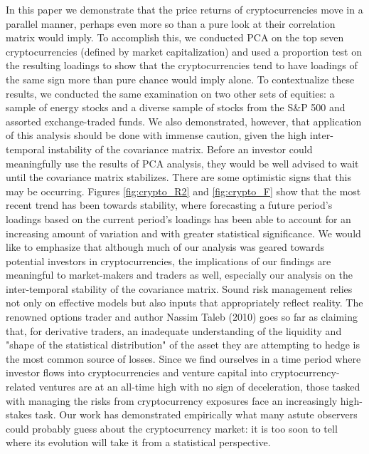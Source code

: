 \documentclass[12pt,twoside]{article}
\begin{document}
In this paper we demonstrate that the price returns of cryptocurrencies move in a parallel manner, perhaps even more so than a pure look at their correlation matrix would imply. To accomplish this, we conducted PCA on the top seven cryptocurrencies (defined by market capitalization) and used a proportion test on the resulting loadings to show that the cryptocurrencies tend to have loadings of the same sign more than pure chance would imply alone. To contextualize these results, we conducted the same examination on two other sets of equities: a sample of energy stocks and a diverse sample of stocks from the S\&P 500 and assorted exchange-traded funds.
\bigbreak
We also demonstrated, however, that application of this analysis should be done with immense caution, given the high inter-temporal instability of the covariance matrix. Before an investor could meaningfully use the results of PCA analysis, they would be well advised to wait until the covariance matrix stabilizes. There are some optimistic signs that this may be occurring. Figures \ref{fig:crypto_R2} and \ref{fig:crypto_F} show that the most recent trend has been towards stability, where forecasting a future period's loadings based on the current period's loadings has been able to account for an increasing amount of variation and with greater statistical significance.
\bigbreak
We would like to emphasize that although much of our analysis was geared towards potential investors in cryptocurrencies, the implications of our findings are meaningful to market-makers and traders as well, especially our analysis on the inter-temporal stability of the covariance matrix. Sound risk management relies not only on effective models but also inputs that appropriately reflect reality. The renowned options trader and author Nassim Taleb (2010) goes so far as claiming that, for derivative traders, an inadequate understanding of the liquidity and "shape of the statistical distribution" of the asset they are attempting to hedge is the most common source of losses. 
\bigbreak
Since we find ourselves in a time period where investor flows into cryptocurrencies and venture capital into cryptocurrency-related ventures are at an all-time high with no sign of deceleration, those tasked with managing the risks from cryptocurrency exposures face an increasingly high-stakes task. Our work has demonstrated empirically what many astute observers could probably guess about the cryptocurrency market: it is too soon to tell where its evolution will take it from a statistical perspective.

\newpage
\end{document}
